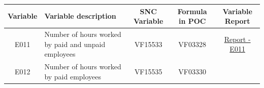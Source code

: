 \documentclass[]{book}
\begin{document}
\begin{longtable}[]{@{}clccc@{}}
\toprule
\begin{minipage}[b]{0.10\columnwidth}\centering
Variable\strut
\end{minipage} & \begin{minipage}[b]{0.25\columnwidth}\raggedright
Variable description\strut
\end{minipage} & \begin{minipage}[b]{0.12\columnwidth}\centering
SNC Variable\strut
\end{minipage} & \begin{minipage}[b]{0.19\columnwidth}\centering
Formula in POC\strut
\end{minipage} & \begin{minipage}[b]{0.20\columnwidth}\centering
Variable Report\strut
\end{minipage}\tabularnewline
\midrule
\endhead
\begin{minipage}[t]{0.10\columnwidth}\centering
E011\strut
\end{minipage} & \begin{minipage}[t]{0.25\columnwidth}\raggedright
Number of hours worked by paid and unpaid employees\strut
\end{minipage} & \begin{minipage}[t]{0.12\columnwidth}\centering
VF15533\strut
\end{minipage} & \begin{minipage}[t]{0.19\columnwidth}\centering
VF03328\strut
\end{minipage} & \begin{minipage}[t]{0.20\columnwidth}\centering
\href{./Auxiliary\%20Files/technical_reports/variable_report/E011.pdf}{Report - E011}\strut
\end{minipage}\tabularnewline
\begin{minipage}[t]{0.10\columnwidth}\centering
E012\strut
\end{minipage} & \begin{minipage}[t]{0.25\columnwidth}\raggedright
Number of hours worked by paid employees\strut
\end{minipage} & \begin{minipage}[t]{0.12\columnwidth}\centering
VF15535\strut
\end{minipage} & \begin{minipage}[t]{0.19\columnwidth}\centering
VF03330\strut
\end{minipage} & \begin{minipage}[t]{0.20\columnwidth}\centering

\end{minipage}
\end{longtable}
\end{document}
